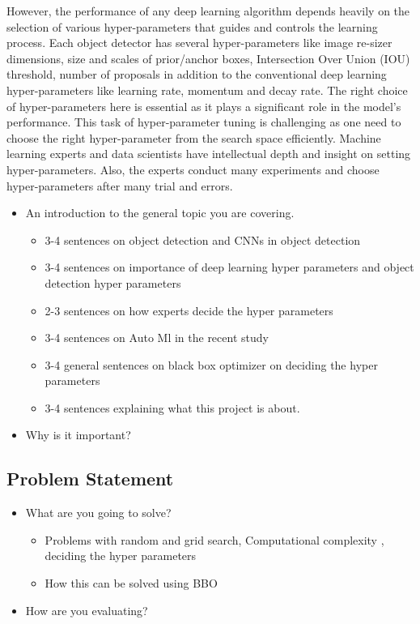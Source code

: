 \documentclass[thesis]{mas_proposal}
\begin{document}
However, the performance of any deep learning algorithm depends heavily on the selection of various hyper-parameters that guides and controls the learning process. Each object detector has several hyper-parameters like image re-sizer dimensions, size and scales of prior/anchor boxes, Intersection Over Union (IOU) threshold, number of proposals in addition to the conventional deep learning hyper-parameters like learning rate, momentum and decay rate. The right choice of hyper-parameters here is essential as it plays a significant role in the model's performance. This task of hyper-parameter tuning is challenging as one need to choose the right hyper-parameter from the search space efficiently. Machine learning experts and data scientists have intellectual depth and insight on setting hyper-parameters. Also, the experts conduct many experiments and choose hyper-parameters after many trial and errors. 
\begin{itemize}
    \item An introduction to the general topic you are covering.
    \begin{itemize}
    \item 3-4 sentences on object detection and CNNs in object detection
    
    \item 3-4 sentences on importance of deep learning hyper parameters and object detection hyper parameters
    \item 2-3 sentences on how experts decide the hyper parameters
    \item 3-4 sentences on Auto Ml in the recent study
    \item 3-4 general sentences on black box optimizer on deciding the hyper parameters
    \item 3-4 sentences explaining what this project is about.
    \end{itemize}
    \item Why is it important?
    
\end{itemize}

\subsection{Problem Statement}
\begin{itemize}
    \item What are you going to solve?
    \begin{itemize}
        \item Problems with random and grid search, Computational complexity , deciding the hyper parameters
        \item How this can be solved using BBO
    \end{itemize}
    \item How are you evaluating?
\end{itemize}
\end{document}
